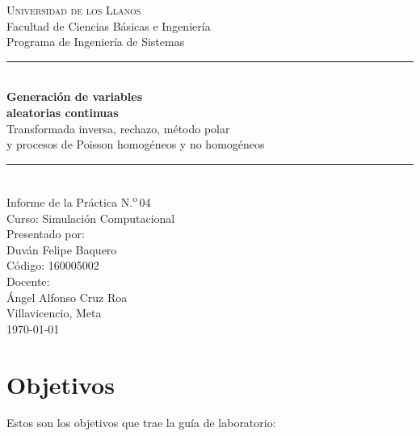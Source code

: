 \documentclass[11pt,letterpaper]{article}
\newcommand{\nombreEstudiante}{Duván Felipe Baquero}
\newcommand{\codigoEstudiante}{160005002}
\newcommand{\nombreDocente}{Ángel Alfonso Cruz Roa}
\begin{document}
\begin{titlepage}
\thispagestyle{empty}
\centering
\vspace*{\fill}

{\large \textsc{Universidad de los Llanos}}\\[0.2cm]
{\normalsize Facultad de Ciencias Básicas e Ingeniería}\\
{\normalsize Programa de Ingeniería de Sistemas}\\[1.6cm]

\rule{\textwidth}{0.8pt}\\[0.5cm]
{\LARGE \textbf{Generación de variables\\ aleatorias continuas}}\\[0.35cm]
{\large Transformada inversa, rechazo, método polar\\
y procesos de Poisson homogéneos y no homogéneos}\\[0.5cm]
\rule{\textwidth}{0.8pt}\\[1.6cm]

{\normalsize Informe de la Práctica N.\textsuperscript{o}\,04}\\
{\normalsize Curso: Simulación Computacional}\\[1.4cm]

{\normalsize Presentado por:}\\[0.15cm]
{\large \nombreEstudiante}\\
{\normalsize Código: \codigoEstudiante}\\[1.2cm]

{\normalsize Docente:}\\[0.15cm]
{\large \nombreDocente}\\[1.6cm]

{\normalsize Villavicencio, Meta \\ \today}

\vspace*{\fill}
\end{titlepage}

\newpage
\tableofcontents
\newpage

\section{Objetivos}

Estos son los objetivos que trae la guía de laboratorio:
\end{document}
